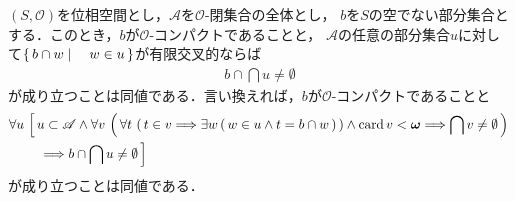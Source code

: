 	\begin{screen}
		\begin{thm}[有限交叉性を用いたコンパクト性の特徴づけ]
		\label{thm:compactness_and_finite_intersection_property}
			$(S,\mathscr{O})$を位相空間とし，$\mathscr{A}$を$\mathscr{O}$-閉集合の全体とし，
			$b$を$S$の空でない部分集合とする．このとき，$b$が$\mathscr{O}$-コンパクトであることと，
			$\mathscr{A}$の任意の部分集合$u$に対して$\left\{\, b \cap w \mid \quad w \in u\, \right\}$が有限交叉的ならば
			\begin{align}
				b \cap \bigcap u \neq \emptyset
			\end{align}
			が成り立つことは同値である．言い換えれば，$b$が$\mathscr{O}$-コンパクトであることと
			\begin{align}
				\forall u\, &\left[\, u \subset \mathscr{A} \wedge
				\forall v\, \left(\, \forall t\, \left(\, t \in v 
				\Longrightarrow \exists w\, (\, w \in u \wedge t = b \cap w\, )\, \right) \wedge \operatorname{card} v < {\boldsymbol \omega}
				\Longrightarrow \bigcap v \neq \emptyset\, \right) \right. \\
				&\quad \left. \Longrightarrow b \cap \bigcap u \neq \emptyset\, \right]
				\label{fom:compactness_and_finite_intersection_property_1}
			\end{align}
			が成り立つことは同値である．
		\end{thm}
	\end{screen}
	
